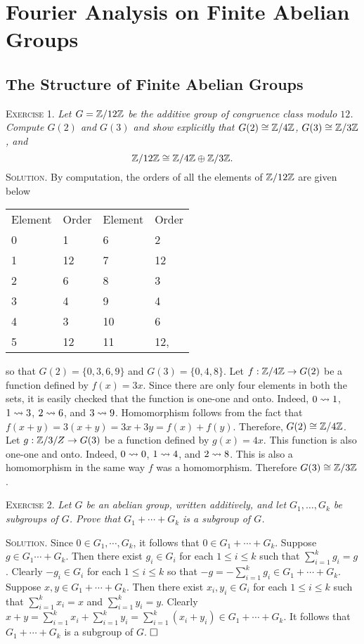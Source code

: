 \documentclass[11pt, leqno]{article}
\newcommand{\done}{\ensuremath{\hfill\square}}
\begin{document}
\clearpage
\section{Fourier Analysis on Finite Abelian Groups}

\subsection{The Structure of Finite Abelian Groups}

\textsc{Exercise 1}. \emph{Let $G = \mathbb{Z}/12\mathbb{Z}$ be the additive group of congruence class modulo $12$. Compute $G(2)$ and $G(3)$ and show explicitly that $G(2) \cong \mathbb{Z}/4\mathbb{Z}$, $G(3) \cong \mathbb{Z}/3\mathbb{Z}$, and 
\begin{displaymath}
\mathbb{Z}/12\mathbb{Z} \cong \mathbb{Z}/4\mathbb{Z} \oplus \mathbb{Z}/3\mathbb{Z}.
\end{displaymath} }\textsc{Solution}. By computation, the orders of all the elements of $\mathbb{Z}/12\mathbb{Z}$ are given below
\begin{longtable}{p{4em} p{4em} p{4em} p{4em}}
  Element & Order & Element & Order \\
  0 & 1 & 6 & 2 \\
  1 & 12 & 7 & 12 \\
  2 & 6 & 8 & 3 \\
  3 & 4 & 9 & 4 \\
  4 & 3 & 10 & 6 \\
  5 & 12 & 11 & 12,
\end{longtable}\reduce
so that $G(2) = \{0, 3, 6, 9\}$ and $G(3) = \{0, 4, 8\}$. Let $f : \mathbb{Z}/4\mathbb{Z} \to G(2)$ be a function defined by $f(x) = 3x$. Since there are only four elements in both the sets, it is easily checked that the function is one-one and onto. Indeed, $0 \rightsquigarrow 1$, $1 \rightsquigarrow 3$, $2 \rightsquigarrow 6$, and $3 \rightsquigarrow 9$. Homomorphism follows from the fact that $f(x+y) = 3(x+y) = 3x + 3y = f(x) + f(y)$. Therefore, $G(2) \cong \mathbb{Z}/4\mathbb{Z}$. Let $g : \mathbb{Z}/3/Z \to G(3)$ be a function defined by $g(x) = 4x$. This function is also one-one and onto. Indeed, $0 \rightsquigarrow 0$, $1 \rightsquigarrow 4$, and $2 \rightsquigarrow 8$. This is also a homomorphism in the same way $f$ was a homomorphism. Therefore $G(3) \cong \mathbb{Z}/3\mathbb{Z}$.

\textsc{Exercise 2}. \emph{Let $G$ be an abelian group, written additively, and let $G_1, \ldots, G_k$ be subgroups of $G$. Prove that $G_1 + \cdots + G_k$ is a subgroup of $G$.}

\textsc{Solution}. Since $0 \in G_1, \cdots, G_k$, it follows that $0 \in G_1 + \cdots + G_k$. Suppose $g \in G_1 \cdots + G_k$. Then there exist $g_i \in G_i$ for each $1 \leq i \leq k$ such that $\sum_{i=1}^k g_i = g$. Clearly $-g_i \in G_i$ for each $1 \leq i \leq k$ so that $-g = -\sum_{i=1}^k g_i \in G_1 + \cdots + G_k$. Suppose $x, y \in G_1 + \cdots + G_k$. Then there exist $x_i, y_i \in G_i$ for each $1 \leq i \leq k$ such that $\sum_{i=1}^k x_i = x$ and $\sum_{i=1}^k y_i = y$. Clearly $x + y = \sum_{i=1}^k x_i + \sum_{i=1}^k y_i = \sum_{i=1}^k (x_i + y_i) \in G_1 + \cdots + G_k$. It follows that $G_1 + \cdots + G_k$ is a subgroup of $G$. \done
\end{document}
